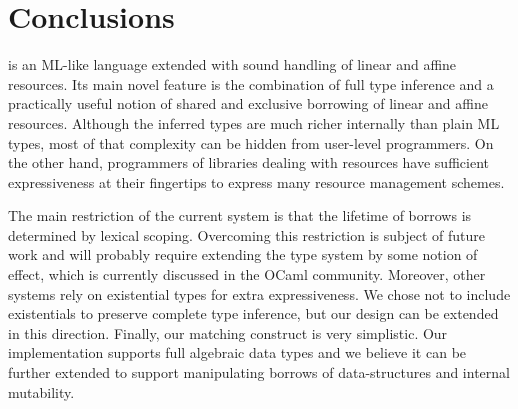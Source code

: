 
\section{Conclusions}
\label{sec:conclusions}

\lang is an ML-like language extended with sound handling of linear and affine resources. Its main novel feature is the combination of full type inference and a practically useful notion of shared and exclusive borrowing of linear and affine resources.
Although the inferred types are much richer internally than plain ML types, most of that complexity can be hidden from user-level programmers. On the other hand, programmers of libraries dealing with resources have sufficient expressiveness at their fingertips to express many resource management schemes.

The main restriction of the current system is that the lifetime of borrows is determined by lexical scoping. Overcoming this restriction is subject of future work and will probably require extending the type system by some notion of effect, which is currently discussed in the OCaml community. 
Moreover, other systems rely on existential types for extra expressiveness. We chose not to include existentials to preserve complete type inference, but our design can be extended in this direction.
Finally, our matching construct is very simplistic.
Our implementation supports full algebraic data types and we believe it
can be further extended to support manipulating borrows of data-structures and
internal mutability.

